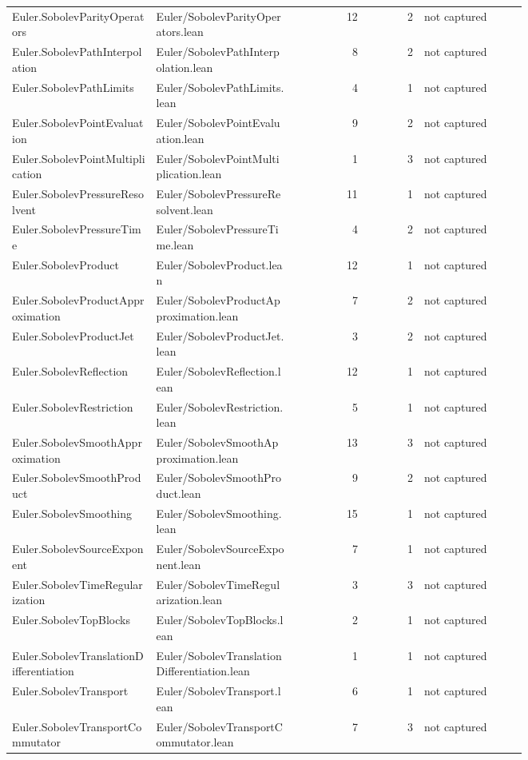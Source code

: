 \documentclass[10pt]{article}
\begin{document}
\begin{longtable}{p{0.28\linewidth}p{0.27\linewidth}r r p{0.20\linewidth}}
Euler.SobolevParityOperators & Euler/SobolevParityOperators.lean & 12 & 2 & not captured\\
Euler.SobolevPathInterpolation & Euler/SobolevPathInterpolation.lean & 8 & 2 & not captured\\
Euler.SobolevPathLimits & Euler/SobolevPathLimits.lean & 4 & 1 & not captured\\
Euler.SobolevPointEvaluation & Euler/SobolevPointEvaluation.lean & 9 & 2 & not captured\\
Euler.SobolevPointMultiplication & Euler/SobolevPointMultiplication.lean & 1 & 3 & not captured\\
Euler.SobolevPressureResolvent & Euler/SobolevPressureResolvent.lean & 11 & 1 & not captured\\
Euler.SobolevPressureTime & Euler/SobolevPressureTime.lean & 4 & 2 & not captured\\
Euler.SobolevProduct & Euler/SobolevProduct.lean & 12 & 1 & not captured\\
Euler.SobolevProductApproximation & Euler/SobolevProductApproximation.lean & 7 & 2 & not captured\\
Euler.SobolevProductJet & Euler/SobolevProductJet.lean & 3 & 2 & not captured\\
Euler.SobolevReflection & Euler/SobolevReflection.lean & 12 & 1 & not captured\\
Euler.SobolevRestriction & Euler/SobolevRestriction.lean & 5 & 1 & not captured\\
Euler.SobolevSmoothApproximation & Euler/SobolevSmoothApproximation.lean & 13 & 3 & not captured\\
Euler.SobolevSmoothProduct & Euler/SobolevSmoothProduct.lean & 9 & 2 & not captured\\
Euler.SobolevSmoothing & Euler/SobolevSmoothing.lean & 15 & 1 & not captured\\
Euler.SobolevSourceExponent & Euler/SobolevSourceExponent.lean & 7 & 1 & not captured\\
Euler.SobolevTimeRegularization & Euler/SobolevTimeRegularization.lean & 3 & 3 & not captured\\
Euler.SobolevTopBlocks & Euler/SobolevTopBlocks.lean & 2 & 1 & not captured\\
Euler.SobolevTranslationDifferentiation & Euler/SobolevTranslationDifferentiation.lean & 1 & 1 & not captured\\
Euler.SobolevTransport & Euler/SobolevTransport.lean & 6 & 1 & not captured\\
Euler.SobolevTransportCommutator & Euler/SobolevTransportCommutator.lean & 7 & 3 & not captured\\

\end{longtable}
\end{document}
